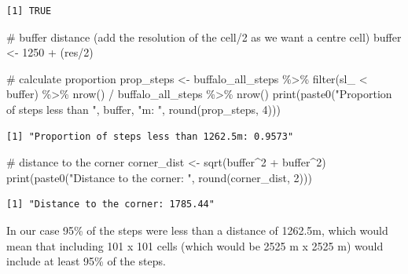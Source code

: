 \documentclass[
  letterpaper,
  DIV=11,
  numbers=noendperiod]{scrartcl}
\newenvironment{Shaded}{\begin{snugshade}}{\end{snugshade}}
\newcommand{\CommentTok}[1]{\textcolor[rgb]{0.37,0.37,0.37}{#1}}
\newcommand{\DecValTok}[1]{\textcolor[rgb]{0.68,0.00,0.00}{#1}}
\newcommand{\FunctionTok}[1]{\textcolor[rgb]{0.28,0.35,0.67}{#1}}
\newcommand{\NormalTok}[1]{\textcolor[rgb]{0.00,0.23,0.31}{#1}}
\newcommand{\OtherTok}[1]{\textcolor[rgb]{0.00,0.23,0.31}{#1}}
\newcommand{\SpecialCharTok}[1]{\textcolor[rgb]{0.37,0.37,0.37}{#1}}
\newcommand{\StringTok}[1]{\textcolor[rgb]{0.13,0.47,0.30}{#1}}
\begin{document}
\begin{verbatim}
[1] TRUE
\end{verbatim}

\begin{Shaded}
\begin{Highlighting}[]
\CommentTok{\# buffer distance (add the resolution of the cell/2 as we want a centre cell)}
\NormalTok{buffer }\OtherTok{\textless{}{-}} \DecValTok{1250} \SpecialCharTok{+}\NormalTok{ (res}\SpecialCharTok{/}\DecValTok{2}\NormalTok{)}

\CommentTok{\# calculate proportion}
\NormalTok{prop\_steps }\OtherTok{\textless{}{-}}\NormalTok{ buffalo\_all\_steps }\SpecialCharTok{\%\textgreater{}\%} \FunctionTok{filter}\NormalTok{(sl\_ }\SpecialCharTok{\textless{}}\NormalTok{ buffer) }\SpecialCharTok{\%\textgreater{}\%} \FunctionTok{nrow}\NormalTok{() }\SpecialCharTok{/}\NormalTok{ buffalo\_all\_steps }\SpecialCharTok{\%\textgreater{}\%} \FunctionTok{nrow}\NormalTok{()}
\FunctionTok{print}\NormalTok{(}\FunctionTok{paste0}\NormalTok{(}\StringTok{"Proportion of steps less than "}\NormalTok{, buffer, }\StringTok{"m: "}\NormalTok{, }\FunctionTok{round}\NormalTok{(prop\_steps, }\DecValTok{4}\NormalTok{)))}
\end{Highlighting}
\end{Shaded}

\begin{verbatim}
[1] "Proportion of steps less than 1262.5m: 0.9573"
\end{verbatim}

\begin{Shaded}
\begin{Highlighting}[]
\CommentTok{\# distance to the corner}
\NormalTok{corner\_dist }\OtherTok{\textless{}{-}} \FunctionTok{sqrt}\NormalTok{(buffer}\SpecialCharTok{\^{}}\DecValTok{2} \SpecialCharTok{+}\NormalTok{ buffer}\SpecialCharTok{\^{}}\DecValTok{2}\NormalTok{)}
\FunctionTok{print}\NormalTok{(}\FunctionTok{paste0}\NormalTok{(}\StringTok{"Distance to the corner: "}\NormalTok{, }\FunctionTok{round}\NormalTok{(corner\_dist, }\DecValTok{2}\NormalTok{)))}
\end{Highlighting}
\end{Shaded}

\begin{verbatim}
[1] "Distance to the corner: 1785.44"
\end{verbatim}

In our case 95\% of the steps were less than a distance of 1262.5m,
which would mean that including 101 x 101 cells (which would be 2525 m x
2525 m) would include at least 95\% of the steps.
\end{document}
